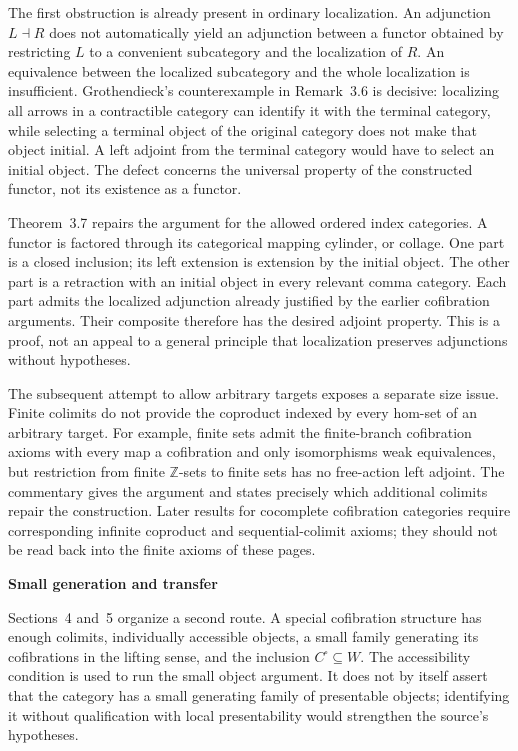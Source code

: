 The first obstruction is already present in ordinary localization. An adjunction $L\dashv R$ does not automatically yield an adjunction between a functor obtained by restricting $L$ to a convenient subcategory and the localization of $R$. An equivalence between the localized subcategory and the whole localization is insufficient. Grothendieck's counterexample in Remark~3.6 is decisive: localizing all arrows in a contractible category can identify it with the terminal category, while selecting a terminal object of the original category does not make that object initial. A left adjoint from the terminal category would have to select an initial object. The defect concerns the universal property of the constructed functor, not its existence as a functor.

Theorem~3.7 repairs the argument for the allowed ordered index categories. A functor is factored through its categorical mapping cylinder, or collage. One part is a closed inclusion; its left extension is extension by the initial object. The other part is a retraction with an initial object in every relevant comma category. Each part admits the localized adjunction already justified by the earlier cofibration arguments. Their composite therefore has the desired adjoint property. This is a proof, not an appeal to a general principle that localization preserves adjunctions without hypotheses.

The subsequent attempt to allow arbitrary targets exposes a separate size issue. Finite colimits do not provide the coproduct indexed by every hom-set of an arbitrary target. For example, finite sets admit the finite-branch cofibration axioms with every map a cofibration and only isomorphisms weak equivalences, but restriction from finite $\mathbb Z$-sets to finite sets has no free-action left adjoint. The commentary gives the argument and states precisely which additional colimits repair the construction. Later results for cocomplete cofibration categories require corresponding infinite coproduct and sequential-colimit axioms; they should not be read back into the finite axioms of these pages.

\medskip\noindent\textbf{Small generation and transfer}

Sections~4 and~5 organize a second route. A special cofibration structure has enough colimits, individually accessible objects, a small family generating its cofibrations in the lifting sense, and the inclusion $C^{\square}\subseteq W$. The accessibility condition is used to run the small object argument. It does not by itself assert that the category has a small generating family of presentable objects; identifying it without qualification with local presentability would strengthen the source's hypotheses.


